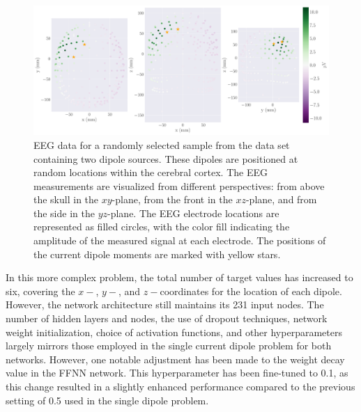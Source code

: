 \documentclass[a4paper, UKenglish, 11pt]{uiomaster}
\begin{document}
\begin{figure}[!htb]
\centering
\includegraphics[width=\linewidth]{figures/purple_green/dipoles_w_amplitudes_eeg_field_2_0.pdf}
\caption{EEG data for a randomly selected sample from the data set containing two dipole sources. These dipoles are positioned at random locations within the cerebral cortex. The EEG measurements are visualized from different perspectives: from above the skull in the $xy$-plane, from the front in the $xz$-plane, and from the side in the $yz$-plane. The EEG electrode locations are represented as filled circles, with the color fill indicating the amplitude of the measured signal at each electrode. The positions of the current dipole moments are marked with yellow stars.}
\label{fig:multiple_dipoles_data}
\end{figure}

\FloatBarrier

In this more complex problem, the total number of target values has increased to six, covering the $x-$, $y-$, and $z-$coordinates for the location of each dipole. However, the network architecture still maintains its 231 input nodes. The number of hidden layers and nodes, the use of dropout techniques, network weight initialization, choice of activation functions, and other hyperparameters largely mirrors those employed in the single current dipole problem for both networks. However, one notable adjustment has been made to the weight decay value in the FFNN network. This hyperparameter has been fine-tuned to 0.1, as this change resulted in a slightly enhanced performance compared to the previous setting of 0.5 used in the single dipole problem.
\end{document}
